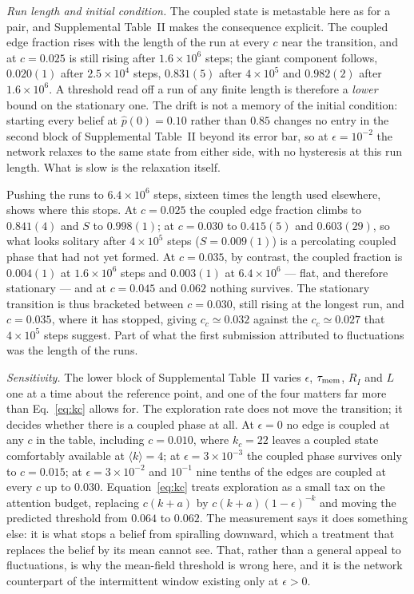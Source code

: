 \documentclass[aps,pre,twocolumn,superscriptaddress,floatfix,longbibliography]{revtex4-2}
\begin{document}
\emph{Run length and initial condition.} The coupled state is metastable
here as for a pair, and Supplemental Table~II makes the consequence explicit. The coupled
edge fraction rises with the length of the run at every $c$ near the transition,
and at $c=0.025$ is still rising after $1.6\times10^{6}$ steps; the giant
component follows, $0.020(1)$ after $2.5\times10^{4}$ steps, $0.831(5)$ after
$4\times10^{5}$ and $0.982(2)$ after $1.6\times10^{6}$. A threshold read off a
run of any finite length is therefore a \emph{lower} bound on the stationary one.
The drift is not a memory of the initial condition: starting every belief at
$\hat p(0)=0.10$ rather than $0.85$ changes no entry in the second block of
Supplemental Table~II beyond its error bar, so at $\epsilon=10^{-2}$ the network relaxes
to the same state from either side, with no hysteresis at this run length. What
is slow is the relaxation itself.

Pushing the runs to $6.4\times10^{6}$ steps, sixteen times the length used
elsewhere, shows where this stops. At $c=0.025$ the coupled edge fraction climbs
to $0.841(4)$ and $S$ to $0.998(1)$; at $c=0.030$ to $0.415(5)$ and $0.603(29)$,
so what looks solitary after $4\times10^{5}$ steps ($S=0.009(1)$) is a
percolating coupled phase that had not yet formed. At $c=0.035$, by contrast, the
coupled fraction is $0.004(1)$ at $1.6\times10^{6}$ steps and $0.003(1)$ at
$6.4\times10^{6}$ --- flat, and therefore stationary --- and at $c=0.045$ and
$0.062$ nothing survives. The stationary transition is thus bracketed between
$c=0.030$, still rising at the longest run, and $c=0.035$, where it has stopped,
giving $c_c\simeq0.032$ against the $c_c\simeq0.027$ that $4\times10^{5}$ steps
suggest. Part of what the first submission attributed to fluctuations was the
length of the runs.

\emph{Sensitivity.} The lower block of Supplemental Table~II varies $\epsilon$,
$\tau_{\rm mem}$, $R_I$ and $L$ one at a time about the reference point, and one
of the four matters far more than Eq.~\eqref{eq:kc} allows for. The exploration
rate does not move the transition; it decides whether there is a coupled phase at
all. At $\epsilon=0$ no edge is coupled at any $c$ in the table, including
$c=0.010$, where $k_c=22$ leaves a coupled state comfortably available at
$\langle k\rangle=4$; at $\epsilon=3\times10^{-3}$ the coupled phase survives
only to $c=0.015$; at $\epsilon=3\times10^{-2}$ and $10^{-1}$ nine tenths of the
edges are coupled at every $c$ up to $0.030$. Equation~\eqref{eq:kc} treats
exploration as a small tax on the attention budget, replacing $c(k+a)$ by
$c(k+a)(1-\epsilon)^{-k}$ and moving the predicted threshold from $0.064$ to
$0.062$. The measurement says it does something else: it is what stops a belief
from spiralling downward, which a treatment that replaces the belief by its mean
cannot see. That, rather than a general appeal to fluctuations, is why the
mean-field threshold is wrong here, and it is the network counterpart of the
intermittent window existing only at $\epsilon>0$.
\end{document}

